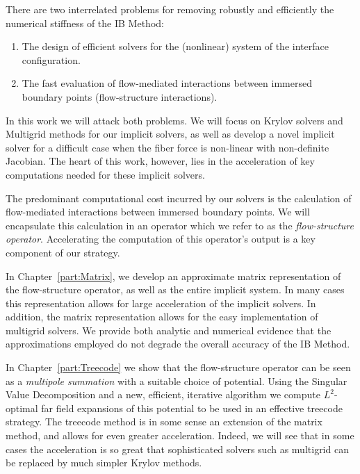 There are two interrelated problems for removing robustly and efficiently the numerical stiffness of the IB Method:
\begin{enumerate}
\item The design of efficient solvers for the (nonlinear) system of the interface configuration.
\item The fast evaluation of flow-mediated  interactions between immersed boundary points (flow-structure interactions).
\end{enumerate}

In this work we will attack both problems. We will focus on Krylov solvers and Multigrid methods for our implicit solvers, as well as develop a novel implicit solver for a difficult case when the fiber force is non-linear with non-definite Jacobian. The heart of this work, however, lies in the acceleration of key computations needed for these implicit solvers.

The predominant computational cost incurred by our solvers is the calculation of flow-mediated interactions between immersed boundary points. We will encapsulate this calculation in an operator which we refer to as the {\em flow-structure operator}. Accelerating the computation of this operator's output is a key component of our strategy.

In Chapter~\ref{part:Matrix}, we develop an approximate matrix representation of the flow-structure operator, as well as the entire implicit system. In many cases this representation allows for large acceleration of the implicit solvers. In addition, the matrix representation allows for the easy implementation of multigrid solvers. We provide both analytic and numerical evidence that the approximations employed do not degrade the overall accuracy of the IB Method.

In Chapter~\ref{part:Treecode} we
show that the flow-structure operator can be seen as a {\em multipole summation} with a suitable choice of potential. Using the Singular Value Decomposition and a new, efficient,  iterative algorithm we compute $L^2$-optimal far field expansions of this potential to be used in an effective treecode strategy.
 The treecode method is in some sense an extension of the matrix method, and allows for even greater acceleration. Indeed, we will see that in some cases the acceleration is so great that sophisticated solvers such as multigrid can be replaced by much simpler Krylov methods.


